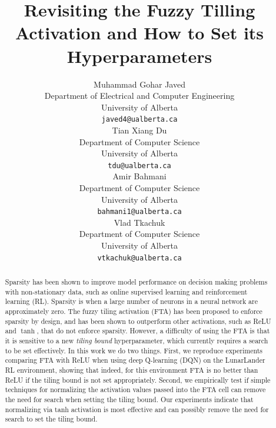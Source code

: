 \documentclass{article}
\title{Revisiting the Fuzzy Tilling Activation and How to Set its Hyperparameters}
\author{%
  Muhammad Gohar Javed \\
  Department of Electrical and Computer Engineering \\
  University of Alberta\\
  \texttt{javed4@ualberta.ca} \\
  \And
  Tian Xiang Du \\
  Department of Computer Science\\
  University of Alberta\\
  \texttt{tdu@ualberta.ca} \\
  \AND
  Amir Bahmani \\
  Department of Computer Science\\
  University of Alberta\\
  \texttt{bahmani1@ualberta.ca} \\
  \And
  Vlad Tkachuk \\
  Department of Computer Science\\
  University of Alberta\\
  \texttt{vtkachuk@ualberta.ca} \\
}
\begin{document}
\maketitle


\begin{abstract}
  Sparsity has been shown to improve model performance on decision making problems with non-stationary data, such as online supervised learning and reinforcement learning (RL).
  Sparsity is when a large number of neurons in a neural network are approximately zero.
  The fuzzy tiling activation (FTA) has been proposed to enforce sparsity by design, and has been shown to outperform other activations, such as ReLU and $\tanh$, that do not enforce sparsity.
  However, a difficulty of using the FTA is that it is sensitive to a new \textit{tiling bound} hyperparameter, which currently requires a search to be set effectively.
  In this work we do two things.
  First, we reproduce experiments comparing FTA with ReLU when using deep Q-learning (DQN) on the LunarLander RL environment, showing that indeed, for this environment FTA is no better than ReLU if the tiling bound is not set appropriately.
  Second, we empirically test if simple techniques for normalizing the activation values passed into the FTA cell can remove the need for search when setting the tiling bound.
  Our experiments indicate that normalizing via tanh activation is most effective and can possibly remove the need for search to set the tiling bound.


\end{abstract}
\end{document}
